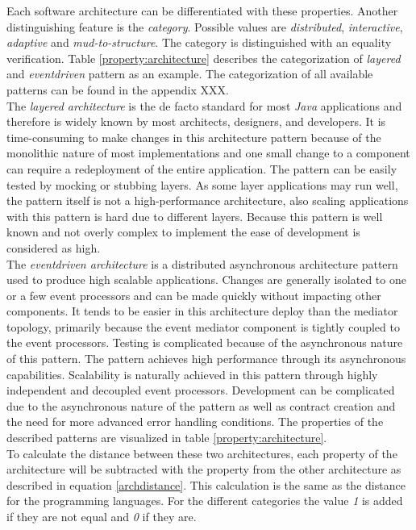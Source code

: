 Each software architecture can be differentiated with these properties. Another distinguishing feature is the \textit{category}. Possible values are \textit{distributed}, \textit{interactive}, \textit{adaptive} and \textit{mud-to-structure}. The category is distinguished with an equality verification. Table \ref{property:architecture} describes the categorization of \textit{layered} and \textit{eventdriven} pattern as an example. The categorization of all available patterns can be found in the appendix XXX.\\
The \textit{layered architecture} is the de facto standard for most \textit{Java} applications and therefore is widely known by most architects, designers, and developers. It is time-consuming to make changes in this architecture pattern because of the monolithic nature of most implementations and one small change to a component can require a redeployment of the entire application. The pattern can be easily tested by mocking or stubbing layers. As some layer applications may run well, the pattern itself is not a high-performance architecture, also scaling applications with this pattern is hard due to different layers. Because this pattern is well known and not overly complex to implement the ease of development is considered as high.\\
The \textit{eventdriven architecture} is a distributed asynchronous architecture pattern used to produce high scalable applications. Changes are generally isolated to one or a few event processors and can be made quickly without impacting other components. It tends to be easier in this architecture deploy than the mediator topology, primarily because the event mediator component is tightly coupled to the event processors. Testing is complicated because of the asynchronous nature of this pattern. The pattern achieves high performance through its asynchronous capabilities. Scalability is naturally achieved in this pattern through highly independent and decoupled event processors. Development can be complicated due to the asynchronous nature of the pattern as well as contract creation and the need for more advanced error handling conditions. The properties of the described patterns are visualized in table \ref{property:architecture}.\\
To calculate the distance between these two architectures, each property of the architecture will be subtracted with the property from the other architecture as described in equation \ref{archdistance}. This calculation is the same as the distance for the programming languages. For the different categories the value \textit{1} is added if they are not equal and \textit{0} if they are. 

